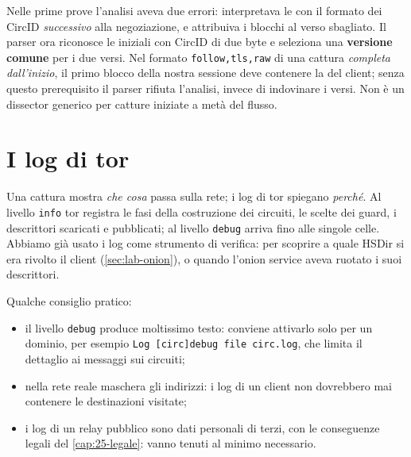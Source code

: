 \begin{attenzione}
Nelle prime prove l'analisi aveva due errori: interpretava le  con il formato dei CircID \emph{successivo} alla negoziazione, e attribuiva i blocchi al verso sbagliato. Il parser ora riconosce le  iniziali con CircID di due byte e seleziona una \textbf{versione comune} per i due versi. Nel formato \texttt{follow,tls,raw} di una cattura \emph{completa dall'inizio}, il primo blocco della nostra sessione deve contenere la  del client; senza questo prerequisito il parser rifiuta l'analisi, invece di indovinare i versi. Non è un dissector generico per catture iniziate a metà del flusso.
\end{attenzione}

\section{I log di tor}\label{sec:traffico-log}

Una cattura mostra \emph{che cosa} passa sulla rete; i log di tor spiegano \emph{perché}. Al livello \texttt{info} tor registra le fasi della costruzione dei circuiti, le scelte dei guard, i descrittori scaricati e pubblicati; al livello \texttt{debug} arriva fino alle singole celle. Abbiamo già usato i log come strumento di verifica: per scoprire a quale HSDir si era rivolto il client (\cref{sec:lab-onion}), o quando l'onion service aveva ruotato i suoi descrittori.

Qualche consiglio pratico:
\begin{itemize}
  \item il livello \texttt{debug} produce moltissimo testo: conviene attivarlo solo per un dominio, per esempio \texttt{Log [circ]debug file circ.log}, che limita il dettaglio ai messaggi sui circuiti;
  \item nella rete reale  maschera gli indirizzi: i log di un client non dovrebbero mai contenere le destinazioni visitate;
  \item i log di un relay pubblico sono dati personali di terzi, con le conseguenze legali del \cref{cap:25-legale}: vanno tenuti al minimo necessario.
\end{itemize}

